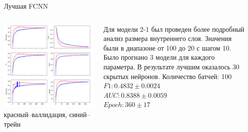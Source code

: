 \documentclass[c, aspectratio = 43]{beamer}
\begin{document}
    \begin{frame}{Лучшая  FCNN}

        \begin{columns}
            \begin{column}{0.7\textwidth}
                \begin{center}
                    \includegraphics[width=1\textwidth]{FCNNres.PNG}
                    \tiny красный--валлидация, синий--трейн
                \end{center}
            \end{column}
            \begin{column}{0.4\textwidth}
                Для модели 2-1 был проведен более подробный анализ размера внутреннего слоя. Значения были в диапазоне от 100 до 20 с шагом 10. Было прогнано 3 модели для каждого параметра. В результате лучшим оказалось 30 скрытых нейронов.
                Количество батчей: 100\\
                \(F1: 0.4832 \pm 0.0024\)\\
                \(AUC: 0.8388 \pm 0.0059\)\\
                \(Epoch: 360 \pm 17\)\\
            \end{column}

        \end{columns}

    \end{frame}
\end{document}
